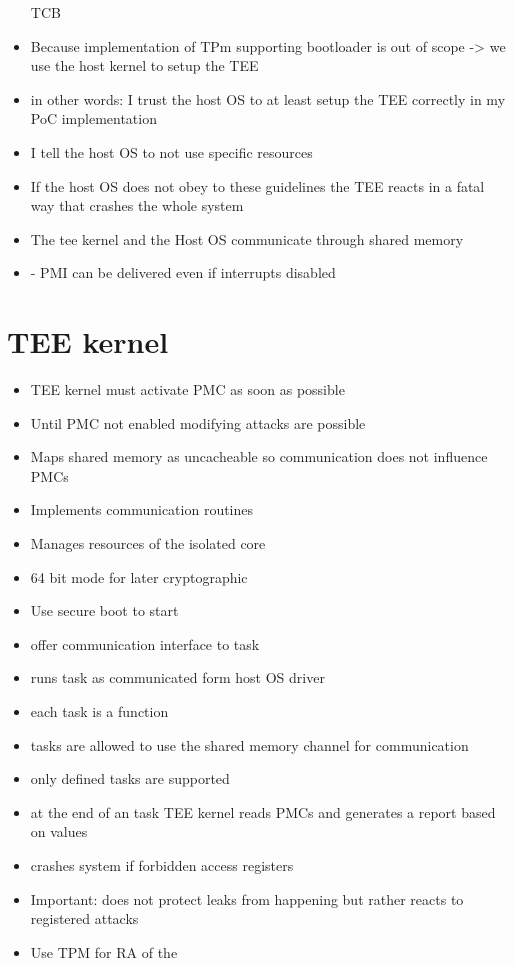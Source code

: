 \begin{itemize}
          TCB
    \item Because implementation of TPm supporting bootloader is out of scope ->
          we use the host kernel to setup the TEE
    \item in other words: I trust the host OS to at least setup the TEE
          correctly in my PoC implementation
    \item I tell the host OS to not use specific resources
    \item If the host OS does not obey to these guidelines the TEE reacts in a fatal way
          that crashes the whole system
    \item The tee kernel and the Host OS communicate through shared memory
    \item - PMI can be delivered even if interrupts disabled
\end{itemize}

\section{TEE kernel}
\begin{itemize}
    \item TEE kernel must activate PMC as soon as possible
    \item Until PMC not enabled modifying attacks are possible
    \item Maps shared memory as uncacheable so communication does not influence PMCs
    \item Implements communication routines
    \item Manages resources of the isolated core
    \item 64 bit mode for later cryptographic
    \item Use secure boot to start
    \item offer communication interface to task
    \item runs task as communicated form host OS driver
    \item each task is a function
    \item tasks are allowed to use the shared memory channel for communication
    \item only defined tasks are supported
    \item at the end of an task TEE kernel reads PMCs and generates a report
          based on values 
    \item crashes system if forbidden access registers 
    \item Important: does not protect leaks from happening but rather reacts to
          registered attacks
    \item Use TPM for RA  of the
\end{itemize}


